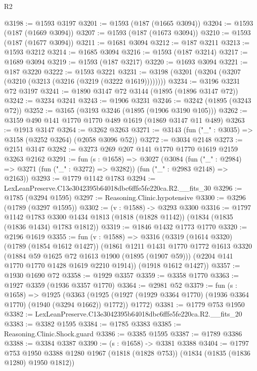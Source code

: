 \begin{lexlean}{R2}
\begin{coremodule}
@3198 := @1593 @3197
@3201 := @1593 (@187 (@1665 @3094))
@3204 := @1593 (@187 (@1669 @3094))
@3207 := @1593 (@187 (@1673 @3094))
@3210 := @1593 (@187 (@1677 @3094))
@3211 := @1681 @3094
@3212 := @187 @3211
@3213 := @1593 @3212
@3214 := @1685 @3094
@3216 := @1593 (@187 @3214)
@3217 := @1689 @3094
@3219 := @1593 (@187 @3217)
@3220 := @1693 @3094
@3221 := @187 @3220
@3222 := @1593 @3221
@3231 := @3198 (@3201 (@3204 (@3207 (@3210 (@3213 (@3216 (@3219 (@3222 @1619))))))))
@3234 := @3196 @3231 @72 @3197
@3241 := @1890 @3147 @72 @3144 (@1895 (@1896 @3147 @72))
@3242 := @3234 @3241
@3243 := @1906 @3231
@3246 := @3242 (@1895 (@3243 @72))
@3252 := @3165 (@3193 @3246 (@1895 (@1906 @3190 @105)))
@3262 := @3159 @490 @141 @1770 @1770 @489 @1619 (@1869 @3147 @11 @489)
@3263 := @1913 @3147
@3264 := @3262 @3263
@3271 := @3143 (fun ("_" : @3035) => @3158 (@3252 @3264) (@2058 @3096 @52))
@3272 := @3034 @2148
@3273 := @2151 @3147
@3282 := @3273 @269 @207 @141 @1770 @1770 @1619 @2159 @3263 @2162
@3291 := fun (s : @1658) =>
  @3027
    (@3084
      (fun ("_" : @2984) => @3271 (fun ("_" : @3272) => @3282))
      (fun ("_" : @2983 @2148) => @2163))
@3293 := @1779 @1142 @1783
@3294 := LexLeanPreserve.C13e3042395b64018dbc6fffe5fe220ca.R2.__fits_30
@3296 := @1785 (@3294 @1595)
@3297 := Reasoning.Clinic.hypotensive
@3300 := @3296 (@1789 (@3297 @1595))
@3302 := (v : @1588) -> @3293 @3300
@3316 := @1797
    @1142
    @1783
    @3300
    @1434
    @1813
    (@1818 (@1828 @1142))
    (@1834 (@1835 (@1836 @1434) @1783 @1812))
@3319 := @1846 @1432 @1773 @1770
@3320 := @2196 @1619
@3355 := fun (v : @1588) =>
  @3316
    (@3319
      (@1614 @3320)
      (@1789 (@1854 @1612 @1427))
      (@1861
        @1211
        @1431
        @1770
        @1772
        @1613
        @3320
        (@1884 @59 @1625 @72 @1613 @1900 (@1895 (@1907 @59)))
        (@2204 @141 @1770 @1770 @1428 @1619 @2210 @1914))
      (@1918 @1612 @1427))
@3357 := @1930 @1690 @72
@3358 := @1929 @3357
@3359 := @3358 @1770
@3363 := @1927 @3359 (@1936 @3357 @1770)
@3364 := @2981 @52
@3379 := fun (s : @1658) =>
  @1925
    (@3363
      (@1925 (@1927 (@1929 @3364 @1770) (@1936 @3364 @1770) (@1940 (@3294 @1662)) @1772))
      @1772)
@3381 := @1779 @753 @1950
@3382 := LexLeanPreserve.C13e3042395b64018dbc6fffe5fe220ca.R2.__fits_20
@3383 := @3382 @1595
@3384 := @1785 @3383
@3385 := Reasoning.Clinic.Shock.guard
@3386 := @3385 @1595
@3387 := @1789 @3386
@3388 := @3384 @3387
@3390 := (s : @1658) -> @3381 @3388
@3404 := @1797
    @753
    @1950
    @3388
    @1280
    @1967
    (@1818 (@1828 @753))
    (@1834 (@1835 (@1836 @1280) @1950 @1812))

\end{coremodule}
\end{lexlean}
